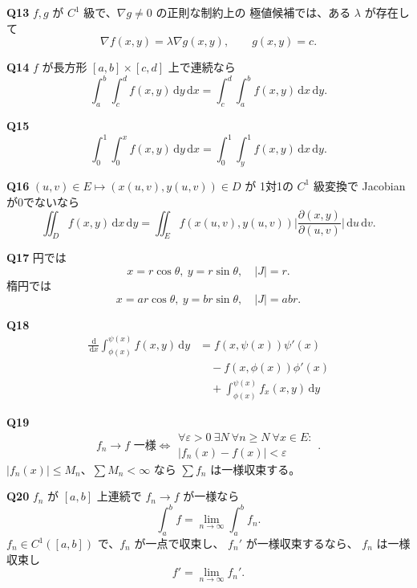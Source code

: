 \documentclass[uplatex,dvipdfmx,9pt]{jsarticle}
\newcommand{\dd}{\,\mathrm d}
\newcommand{\abs}[1]{\lvert#1\rvert}
\newlength{\colht}
\newlength{\colwd}
\newlength{\hdrgap}
\newcommand{\sheettitle}[3]{%
  \sbox{\hdrbox}{\begin{minipage}{\textwidth}
    {\color{navy}\bfseries\large #1}\hfill
    {\color{muted}\bfseries #2}\par
    \vspace{.6mm}
    {\small #3}\par
    \vspace{1.4mm}{\color{navy}\rule{\linewidth}{.65pt}}%
  \end{minipage}}%
  \noindent\usebox{\hdrbox}\par\nobreak
  \setlength{\colwd}{\dimexpr.5\textwidth-.5\columnsep\relax}%
  \setlength{\colht}{\dimexpr\textheight-\ht\hdrbox-\dp\hdrbox-\hdrgap-.5mm\relax}%
  \vspace{\hdrgap}\nointerlineskip
}
\newcommand{\answer}[2]{%
  \par\noindent
  {\color{teal}\bfseries Q#1}\quad #2\par
  \vspace{1.5mm}
}
\newcommand{\must}[1]{\boxed{\displaystyle #1}}
\begin{document}
\begin{multicols}{2}
\answer{13}{
\(f,g\) が \(C^1\) 級で、\(\nabla g\ne0\) の正則な制約上の
極値候補では、ある \(\lambda\) が存在して
\[
\must{\nabla f(x,y)=\lambda\nabla g(x,y)},
\qquad g(x,y)=c.
\]}

\answer{14}{
\(f\) が長方形 \([a,b]\times[c,d]\) 上で連続なら
\[
\must{
\int_a^b\int_c^df(x,y)\dd y\dd x
=
\int_c^d\int_a^bf(x,y)\dd x\dd y}.
\]}

\answer{15}{
\[
\must{
\int_0^1\int_0^xf(x,y)\dd y\dd x
=
\int_0^1\int_y^1f(x,y)\dd x\dd y}.
\]}

\answer{16}{
\((u,v)\in E\mapsto(x(u,v),y(u,v))\in D\) が
1対1の \(C^1\) 級変換で Jacobian が0でないなら
\[
\must{
\iint_Df(x,y)\dd x\dd y
=
\iint_E f(x(u,v),y(u,v))
\abs{\frac{\partial(x,y)}{\partial(u,v)}}\dd u\dd v}.
\]}

\answer{17}{
円では
\[
x=r\cos\theta,\ y=r\sin\theta,\quad
\abs J=r.
\]
楕円では
\[
x=ar\cos\theta,\ y=br\sin\theta,\quad
\abs J=abr.
\]}

\answer{18}{
\[
\boxed{\begin{aligned}
\frac{\dd}{\dd x}\int_{\phi(x)}^{\psi(x)}f(x,y)\dd y
&=f(x,\psi(x))\psi'(x)\\
&\quad-f(x,\phi(x))\phi'(x)\\
&\quad+\int_{\phi(x)}^{\psi(x)}f_x(x,y)\dd y
\end{aligned}}
\]}

\answer{19}{
\[
f_n\to f\text{ 一様}
\iff
\begin{gathered}
\forall\varepsilon>0\ \exists N\
\forall n\ge N\ \forall x\in E:\\
\abs{f_n(x)-f(x)}<\varepsilon
\end{gathered}.
\]
\(\abs{f_n(x)}\le M_n\)、\(\sum M_n<\infty\) なら
\(\sum f_n\) は一様収束する。}

\answer{20}{
\(f_n\) が \([a,b]\) 上連続で \(f_n\to f\) が一様なら
\[
\int_a^bf=\lim_{n\to\infty}\int_a^bf_n.
\]
\(f_n\in C^1([a,b])\) で、\(f_n\) が一点で収束し、
\(f_n'\) が一様収束するなら、
\(f_n\) は一様収束し
\[
f'=\lim_{n\to\infty}f_n'.
\]}
\end{multicols}

\clearpage
\sheettitle{解答｜集合と位相}{20問}
{全体空間・部分空間・距離空間の区別に注意する。}
\end{document}
